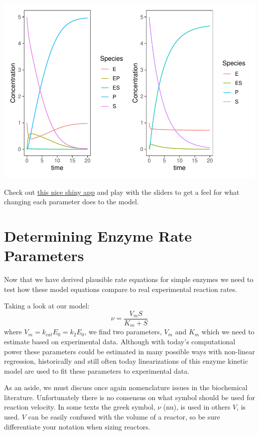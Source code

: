 \documentclass[
]{article}
\begin{document}
\includegraphics{Bioprocess_Engineering_files/figure-latex/unnamed-chunk-25-1.pdf}

Check out \href{https://stevecheckley.shinyapps.io/shiny_mm/}{this nice shiny app} and play with the sliders to get a feel for what changing each parameter does to the model.

\hypertarget{determining-enzyme-rate-parameters}{%
\section{Determining Enzyme Rate Parameters}\label{determining-enzyme-rate-parameters}}

Now that we have derived plausible rate equations for simple enzymes we need to test how these model equations compare to real experimental reaction rates.

Taking a look at our model:
\[\nu = \frac{V_mS}{K_m + S}\]
where \(V_m = k_{cat}E_0 = k_2E_0\), we find two parameters, \(V_m\) and \(K_m\) which we need to estimate based on experimental data. Although with today's computational power these parameters could be estimated in many possible ways with non-linear regression, historically and still often today linearizations of this enzyme kinetic model are used to fit these parameters to experimental data.

As an aside, we must discuss once again nomenclature issues in the biochemical literature. Unfortunately there is no consensus on what symbol should be used for reaction velocity. In some texts the greek symbol, \(\nu\) (nu), is used in others \(V\), is used. \(V\) can be easily confused with the volume of a reactor, so be sure differentiate your notation when sizing reactors.
\end{document}
